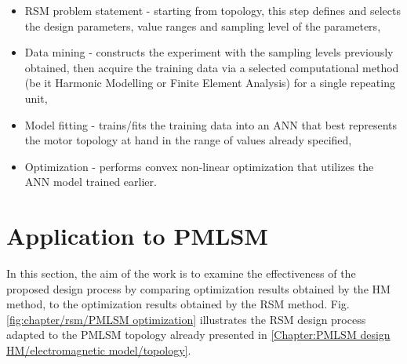        
        \begin{itemize}
            \item RSM problem statement - starting from topology, this step defines and selects the design parameters, value ranges and sampling level of the parameters,
            \item Data mining - constructs the experiment with the sampling levels previously obtained, then acquire the training data via a selected computational method (be it Harmonic Modelling or Finite Element Analysis) for a single repeating unit,
            \item Model fitting - trains/fits the training data into an \ac{ANN} that best represents the motor topology at hand in the range of values already specified,
            \item Optimization - performs convex non-linear optimization that utilizes the \ac{ANN} model trained earlier.
        \end{itemize}
        

    \section{Application to \ac{PMLSM}}             \label{Chapter:RSM/PMLSM}
    
        
        In this section, the aim of the work is to examine the effectiveness of the proposed design process by comparing optimization results obtained by the \acs{HM} method, to the optimization results obtained by the \acs{RSM} method. Fig.\,\ref{fig:chapter/rsm/PMLSM optimization} illustrates the \acs{RSM} design process adapted to the \acs{PMLSM} topology already presented in \ref{Chapter:PMLSM design HM/electromagnetic model/topology}. 
        
